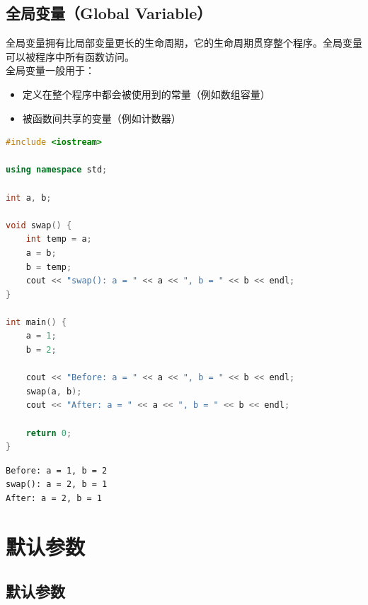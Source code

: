\vspace{0.5cm}

\subsection{全局变量（Global Variable）}

全局变量拥有比局部变量更长的生命周期，它的生命周期贯穿整个程序。全局变量可以被程序中所有函数访问。\\

全局变量一般用于：

\begin{itemize}
	\item 定义在整个程序中都会被使用到的常量（例如数组容量）
	\item 被函数间共享的变量（例如计数器）
\end{itemize}

\vspace{0.5cm}


\begin{lstlisting}[language=C++]
#include <iostream>

using namespace std;

int a, b;

void swap() {
	int temp = a;
	a = b;
	b = temp;
	cout << "swap(): a = " << a << ", b = " << b << endl;
}

int main() {
	a = 1;
	b = 2;

	cout << "Before: a = " << a << ", b = " << b << endl;
	swap(a, b);
	cout << "After: a = " << a << ", b = " << b << endl;

	return 0;
}
\end{lstlisting}

\begin{tcolorbox}
	\begin{verbatim}
Before: a = 1, b = 2
swap(): a = 2, b = 1
After: a = 2, b = 1
	\end{verbatim}
\end{tcolorbox}

\newpage

\section{默认参数}

\subsection{默认参数}

